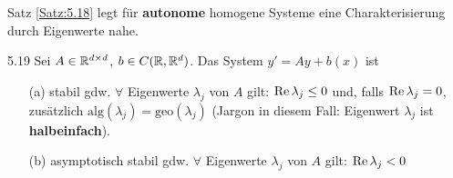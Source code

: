 \documentclass[a4paper]{article}
\begin{document}
Satz \ref{Satz:5.18} legt für \textbf{autonome} homogene Systeme eine Charakterisierung durch Eigenwerte nahe.

\begin{Satz}{}{5.19}
Sei $A\in\mathbb R^{d\times d}$, $b\in C(\mathbb R,\mathbb R^d)$. Das System $y'=Ay+b(x)$ ist
\begin{itemize}
\item[(a)] stabil gdw. $\forall$ Eigenwerte $\lambda_j$ von $A$ gilt: $\operatorname{\textrm{Re}} \lambda_j\le 0$ und, falls $\operatorname{\textrm{Re}}\lambda_j=0$, zusätzlich $\mathrm{alg}(\lambda_j)=\mathrm{geo}(\lambda_j)$ (Jargon in diesem Fall: \glqq Eigenwert $\lambda_j$ ist \textbf{halbeinfach}\grqq).
\item[(b)] asymptotisch stabil gdw. $\forall$ Eigenwerte $\lambda_j$ von $A$ gilt: $\operatorname{\textrm{Re}} \lambda_j<0$
\end{itemize}
\end{Satz}
\end{document}
